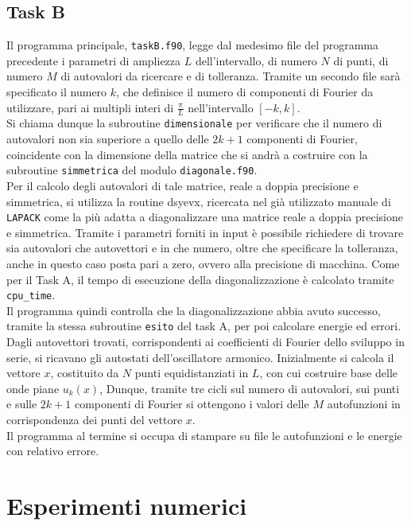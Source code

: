 \documentclass[a4paper,11pt]{article}
\begin{document}
\subsection*{Task B}
Il programma principale, {\tt taskB.f90}, legge dal medesimo file del programma precedente i parametri di ampliezza $L$ dell'intervallo, di numero $N$ di punti, di numero $M$ di autovalori da ricercare e di tolleranza. Tramite un secondo file sarà specificato il numero $k$, che definisce il numero di componenti di Fourier da utilizzare, pari ai multipli interi di $\frac{\pi}{L}$ nell'intervallo $[-k, k]$.\\
Si chiama dunque la subroutine {\tt dimensionale} per verificare che il numero di autovalori non sia superiore a quello delle $2k + 1$ componenti di Fourier, coincidente con la dimensione della matrice che si andrà a costruire con la subroutine {\tt simmetrica} del modulo {\tt diagonale.f90}.\\
Per il calcolo degli autovalori di tale matrice, reale a doppia precisione e simmetrica, si utilizza la routine {dsyevx}, ricercata nel già utilizzato manuale di {\tt LAPACK} come la più adatta a diagonalizzare una matrice reale a doppia precisione e simmetrica. Tramite i parametri forniti in input è possibile richiedere di trovare sia autovalori che autovettori e in che numero, oltre che specificare la tolleranza, anche in questo caso posta pari a zero, ovvero alla precisione di macchina. Come per il Task A, il tempo di esecuzione della diagonalizzazione è calcolato tramite  {\tt cpu\_time}. \\ 
Il programma quindi controlla che la diagonalizzazione abbia avuto successo, tramite la stessa subroutine {\tt esito} del task A, per poi calcolare energie ed errori. \\
Dagli autovettori trovati, corrispondenti ai coefficienti di Fourier dello sviluppo in serie, si ricavano gli autostati dell'oscillatore armonico. Inizialmente si calcola il vettore $x$, costituito da $N$ punti equidistanziati in $L$, con cui costruire base delle onde piane $u_k(x)$, Dunque, tramite tre cicli sul numero di autovalori, sui punti e sulle $2k+1$ componenti di Fourier si ottengono i valori delle $M$ autofunzioni in corrispondenza dei punti del vettore $x$. \\
Il programma al termine si occupa di stampare su file le autofunzioni e le energie con relativo errore.

\section*{Esperimenti numerici}
\end{document}
